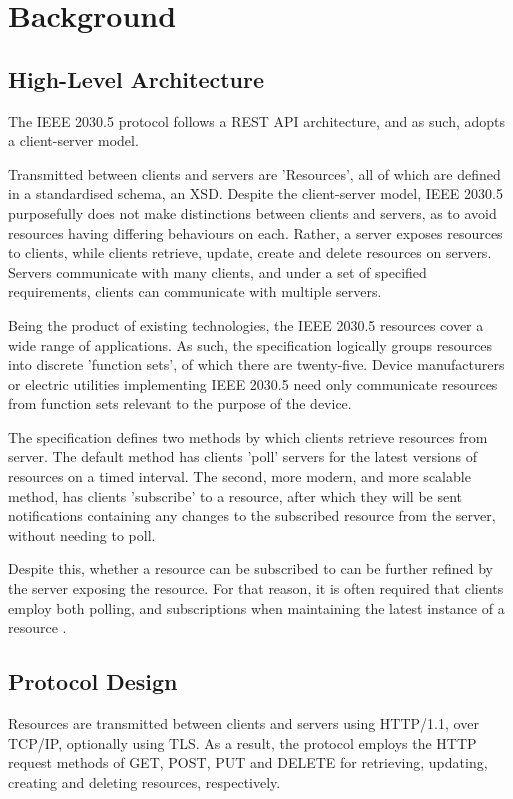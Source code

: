 \chapter{Background}\label{ch:background}

\section{High-Level Architecture}
The IEEE 2030.5 protocol follows a REST API architecture, and as such, adopts a client-server model.

Transmitted between clients and servers are 'Resources', all of which are defined in a standardised schema, an XSD. 
Despite the client-server model, IEEE 2030.5 purposefully does not make distinctions between clients and servers, as to avoid resources having differing behaviours on each. Rather, a server exposes resources to clients, while clients retrieve, update, create and delete resources on servers.
Servers communicate with many clients, and under a set of specified requirements, clients can communicate with multiple servers.

Being the product of existing technologies, the IEEE 2030.5 resources cover a wide range of applications. As such, the specification logically groups resources into discrete 'function sets', of which there are twenty-five. 
Device manufacturers or electric utilities implementing IEEE 2030.5 need only communicate resources from function sets relevant to the purpose of the device. 

The specification defines two methods by which clients retrieve resources from server. The default method has clients 'poll' servers for the latest versions of resources on a timed interval.
The second, more modern, and more scalable method, has clients 'subscribe' to a resource, after which they will be sent notifications containing any changes to the subscribed resource from the server, without needing to poll.

Despite this, whether a resource can be subscribed to can be further refined by the server exposing the resource.
For that reason, it is often required that clients employ both polling, and subscriptions when maintaining the latest instance of a resource \cite{AUSDOE} \cite{IEEE2030.5}. 

\section{Protocol Design}
Resources are transmitted between clients and servers using HTTP/1.1, over TCP/IP, optionally using TLS.
As a result, the protocol employs the HTTP request methods of GET, POST, PUT and DELETE for retrieving, updating, creating and deleting resources, respectively.

